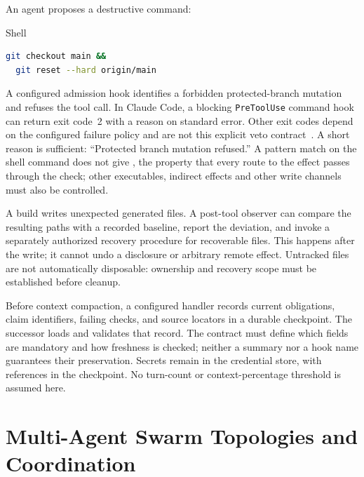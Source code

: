 \begin{description}[leftmargin=1.5em,style=sameline,font=\normalfont]
\item[\textbf{Case A: Pre-tool refusal.}]
An agent proposes a destructive command:
\begin{pdlisting}{Shell}{}
\begin{lstlisting}[language=bash,basicstyle=\ttfamily\small,breaklines=true]
git checkout main &&
  git reset --hard origin/main
\end{lstlisting}
\end{pdlisting}
A configured admission hook identifies a forbidden protected-branch mutation
and refuses the tool call. In Claude Code, a blocking \texttt{PreToolUse}
command hook can return exit code~2 with a reason on standard error.
Other exit codes depend on the configured failure policy and are not this
explicit veto contract~. A short
reason is sufficient: ``Protected branch mutation refused.'' A pattern match on
the shell command does not give , the property that
every route to the effect passes through the check; other executables,
indirect effects and other write channels must also be controlled.

\item[\textbf{Case B: Post-tool recovery.}]
A build writes unexpected generated files. A post-tool observer can compare
the resulting paths with a recorded baseline, report the deviation, and invoke
a separately authorized recovery procedure for recoverable files. This happens
after the write; it cannot undo a disclosure or arbitrary remote effect.
Untracked files are not automatically disposable: ownership and recovery
scope must be established before cleanup.

\item[\textbf{Case C: Compaction preparation.}]
Before context compaction, a configured handler records current obligations,
claim identifiers, failing checks, and source locators in a durable checkpoint.
The successor loads and validates that record. The contract must define which
fields are mandatory and how freshness is checked; neither a summary nor a
hook name guarantees their preservation. Secrets remain in the credential
store, with references in the checkpoint. No turn-count or context-percentage
threshold is assumed here.
\end{description}


\section{Multi-Agent Swarm Topologies and Coordination}\label{sec:prereq-swarms}

